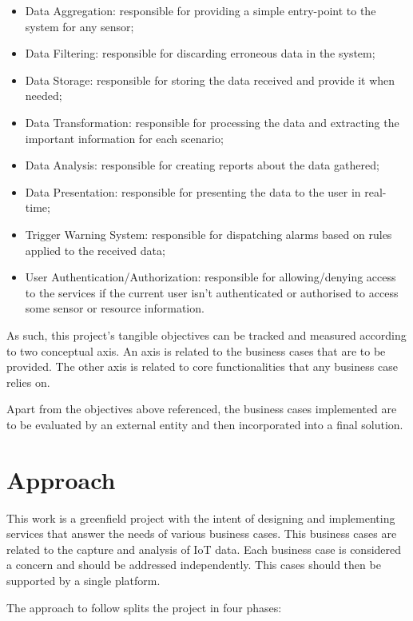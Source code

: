 \begin{itemize}
    \item Data Aggregation: responsible for providing a simple entry-point to the system for any sensor;
    \item Data Filtering: responsible for discarding erroneous data in the system; 
    \item Data Storage: responsible for storing the data received and provide it when needed; 
    \item Data Transformation: responsible for processing the data and extracting the important information for each scenario;
    \item Data Analysis: responsible for creating reports about the data gathered;
    \item Data Presentation: responsible for presenting the data to the user in real-time;
    \item Trigger Warning System: responsible for dispatching alarms based on rules applied to the received data;
    \item User Authentication/Authorization: responsible for allowing/denying access to the services if the current user isn't authenticated or authorised to access some sensor or resource information.
\end{itemize}

As such, this project's tangible objectives can be tracked and measured according to two conceptual axis.
An axis is related to the business cases that are to be provided. The other axis is related to core functionalities that any business case relies on.

Apart from the objectives above referenced, the business cases implemented are to be evaluated by an external entity and then incorporated into a final solution.

\section{Approach}
\label{sec:introduction:approach}

This work is a greenfield project with the intent of designing and implementing services that answer the needs of various business cases. This business cases are related to the capture and analysis of \gls{IoT} data.
Each business case is considered a concern and should be addressed independently.
This cases should then be supported by a single platform.

The approach to follow splits the project in four phases:

